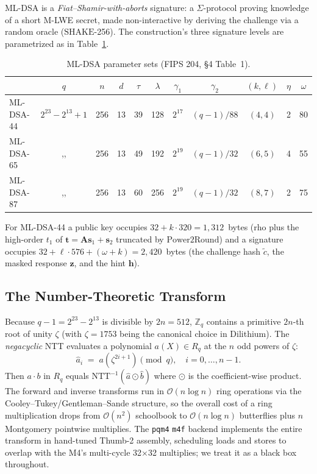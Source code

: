 \documentclass[11pt,a4paper]{article}
\newcommand{\Z}{\mathbb{Z}}
\newcommand{\Zq}{\Z_q}
\newcommand{\Rq}{R_q}
\newcommand{\iNTT}{\mathrm{NTT}^{-1}}
\newcommand{\Power}{\mathrm{Power2Round}}
\newcommand{\SHAKE}{\mathrm{SHAKE}}
\newcommand{\bigO}{\mathcal{O}}
\begin{document}
ML-DSA is a \emph{Fiat--Shamir-with-aborts} signature: a $\Sigma$-protocol
proving knowledge of a short M-LWE secret, made non-interactive by
deriving the challenge via a random oracle ($\SHAKE$-256). The
construction's three signature levels are parametrized as in
Table~\ref{tab:mldsa-params}.

\begin{table}[h]
\centering
\caption{ML-DSA parameter sets (FIPS 204, \S4 Table~1).}
\label{tab:mldsa-params}
\begin{tabular}{l c c c c c c c c c c}
\toprule
            & $q$       & $n$  & $d$ & $\tau$ & $\lambda$ & $\gamma_1$ & $\gamma_2$       & $(k,\ell)$ & $\eta$ & $\omega$ \\
\midrule
ML-DSA-44   & $2^{23}{-}2^{13}{+}1$ & 256 & 13 & 39 & 128 & $2^{17}$  & $(q{-}1)/88$ & $(4,4)$ & 2 & 80 \\
ML-DSA-65   & ,, & 256 & 13 & 49 & 192 & $2^{19}$  & $(q{-}1)/32$ & $(6,5)$ & 4 & 55 \\
ML-DSA-87   & ,, & 256 & 13 & 60 & 256 & $2^{19}$  & $(q{-}1)/32$ & $(8,7)$ & 2 & 75 \\
\bottomrule
\end{tabular}
\end{table}

For ML-DSA-44 a public key occupies $32 + k \cdot 320 = 1{,}312$~bytes
(rho plus the high-order $t_1$ of $\mathbf{t} = \mathbf{A}\mathbf{s}_1 +
\mathbf{s}_2$ truncated by $\Power$) and a signature occupies
$32 + \ell \cdot 576 + (\omega + k) = 2{,}420$~bytes (the challenge hash
$\tilde c$, the masked response $\mathbf{z}$, and the hint $\mathbf{h}$).

\subsection{The Number-Theoretic Transform}

Because $q-1 = 2^{23} - 2^{13}$ is divisible by $2n = 512$, $\Zq$ contains
a primitive $2n$-th root of unity $\zeta$ (with $\zeta = 1753$ being the
canonical choice in Dilithium). The \emph{negacyclic} NTT evaluates a
polynomial $a(X) \in \Rq$ at the $n$ odd powers of $\zeta$:
\[
  \widehat{a}_i \;=\; a(\zeta^{2i+1}) \pmod{q}, \quad i = 0,\dots,n-1.
\]
Then $a \cdot b$ in $\Rq$ equals $\iNTT(\widehat{a} \odot \widehat{b})$
where $\odot$ is the coefficient-wise product. The forward and inverse
transforms run in $\bigO(n \log n)$ ring operations via the
Cooley--Tukey/Gentleman--Sande structure, so the overall cost of a ring
multiplication drops from $\bigO(n^2)$ schoolbook to $\bigO(n \log n)$
butterflies plus $n$ Montgomery pointwise multiplies. The \texttt{pqm4}
\texttt{m4f} backend implements the entire transform in hand-tuned
Thumb-2 assembly, scheduling loads and stores to overlap with the M4's
multi-cycle 32$\times$32 multiplies; we treat it as a black box throughout.
\end{document}
